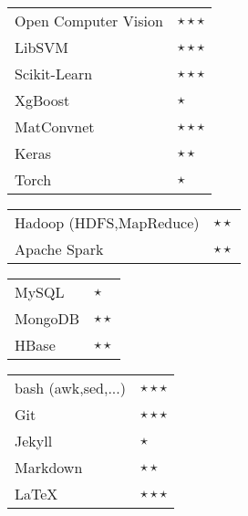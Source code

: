 \documentclass[11pt,a4paper,sans]{moderncv}
\begin{document}
\cvitem{}
{
\hspace{10mm}\begin{tabular}{p{5cm}l}
Open Computer Vision & $\star\star\star$ \\
LibSVM & $\star\star\star$ \\
Scikit-Learn & $\star\star\star$ \\
XgBoost & $\star$ \\
MatConvnet & $\star\star\star$ \\
Keras & $\star\star$ \\
Torch & $\star$ \\
\end{tabular}
\linebreak
}

\cvitem{}
{
\hspace{10mm}\begin{tabular}{p{5cm}l}
Hadoop (HDFS,MapReduce) & $\star\star$ \\
Apache Spark & $\star\star$ \\
\end{tabular}
\linebreak
}
\cvitem{}
{
\hspace{10mm}\begin{tabular}{p{5cm}l}
MySQL & $\star$ \\
MongoDB & $\star\star$ \\
HBase & $\star\star$ \\
\end{tabular}
\linebreak
}

\cvitem{}
{
\hspace{10mm}\begin{tabular}{p{5cm}l}
bash  (awk,sed,...) & $\star\star\star$ \\
Git  & $\star\star\star$ \\
Jekyll  & $\star$ \\
Markdown  & $\star\star$ \\
\LaTeX  & $\star\star\star$ \\
\end{tabular}
\linebreak
}



\end{document}
